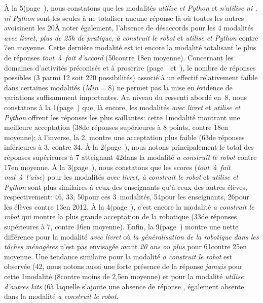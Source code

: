             À la 5\ieme {}({\footnotesize page~\pageref{QA5-5}}), nous constatons que les modalités \textit{utilise  et Python} et \textit{n'utilise ni , ni Python} sont les seules à ne totaliser aucune réponse  là où toutes les autres avoisinent les 20\prc[.] À noter également, l'absence de désaccords pour les 4 modalités \textit{avec livret, plus de 25h de pratique, à construit le robot} et \textit{utilise  et Python} contre 7\prc en moyenne. Cette dernière modalité est ici encore la modalité totalisant le plus de réponses \textit{tout~à~fait d'accord} (50\prc contre 18\prc en moyenne).
            Concernant les domaines d'activités préconisés et à proscrire ({\footnotesize page~\pageref{QA6}~et~\pageref{QA7}}), le nombre de réponses possibles (3 parmi 12 soit 220 possibilités) associé à un effectif relativement faible dans certaines modalités ($Min=8$) ne permet pas la mise en évidence de variations suffisamment importantes.
            Au niveau du ressenti abordé en~8, nous constatons à la 1\iere {}({\footnotesize page~\pageref{QA8-1}}) que, là encore, les modalités \textit{avec livret} et \textit{utilise  et Python} offrent les réponses les plus saillantes: cette 1\iere modalité montrant une meilleure acceptation (38\prc de réponses supérieures à 8 points, contre 18\prc en moyenne); à l'inverse, la 2\nde, montre une acceptation plus faible (63\prc de réponses inférieures à 3, contre 34\prc[)].
            À la 2\ieme {}({\footnotesize page~\pageref{QA8-2}}), nous notons principalement le total des réponses supérieures à 7 atteignant 42\prc dans la modalité \textit{a construit le robot} contre 17\prc en moyenne.
            À la 3\ieme {}({\footnotesize page~\pageref{QA8-3}}), nous constatons que les scores (\textit{tout~à~fait mal~à~l'aise}) pour les modalités \textit{avec livret, à construit le robot} et \textit{utilise  et Python} sont plus similaires à ceux des enseignants qu'à ceux des autres élèves, respectivement: 46, 33, 50\prc pour ces 3~modalités, 54\prc pour les enseignants, 26\prc pour les élèves contre 13\prc en 2012.
            À la 4\ieme {}({\footnotesize page~\pageref{QA8-4}}), c'est encore la modalité \textit{a construit le robot} qui montre la plus grande acceptation de la robotique (33\prc de réponses supérieures à 7, contre 16\prc en moyenne).
            Enfin, la 9\ieme {}({\footnotesize page~\pageref{QA9}}) montre une nette différence pour la modalité \textit{avec livret} où \textit{la généralisation de la robotique dans les tâches ménagères} n'est pas envisagée avant \textit{20 ans ou plus} pour 61\prc[,] contre 25\prc en moyenne. Une tendance similaire pour la modalité \textit{a construit le robot} est observée (42\prc[)], nous notons aussi une forte présence de la réponse \textit{jamais} pour cette 1\iere modalité (8\prc contre moins de 2,5\prc en moyenne) et pour la modalité \textit{utilise d'autres kits} (6\prc[)] à laquelle s'ajoute une absence de réponse , également absente dans la modalité \textit{a construit le robot}.

